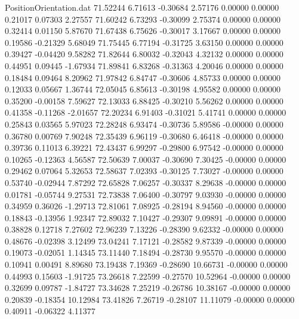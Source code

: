 \begin{filecontents}{PositionOrientation.dat}
  71.52244    6.71613   -0.30684     2.57176    0.00000    0.00000    0.21017    0.07303    2.27557
  71.60242    6.73293   -0.30099     2.75374    0.00000    0.00000    0.32414    0.01150    5.87670
  71.67438    6.75626   -0.30017     3.17667    0.00000    0.00000    0.19586   -0.21329    5.68049
  71.75445    6.77194   -0.31725     3.63150    0.00000    0.00000    0.39427   -0.04420    9.58282
  71.82644    6.80032   -0.32043     4.32132    0.00000    0.00000    0.44951    0.09445   -1.67934
  71.89841    6.83268   -0.31363     4.20046    0.00000    0.00000    0.18484    0.09464    8.20962
  71.97842    6.84747   -0.30606     4.85733    0.00000    0.00000    0.12033    0.05667    1.36744
  72.05045    6.85613   -0.30198     4.95582    0.00000    0.00000    0.35200   -0.00158    7.59627
  72.13033    6.88425   -0.30210     5.56262    0.00000    0.00000    0.41358   -0.11268   -2.01657
  72.20234    6.91403   -0.31021     5.41741    0.00000    0.00000    0.25843    0.03565    5.97023
  72.28248    6.93474   -0.30736     5.89586   -0.00000    0.00000    0.36780    0.00769    7.90248
  72.35439    6.96119   -0.30680     6.46418   -0.00000    0.00000    0.39736    0.11013    6.39221
  72.43437    6.99297   -0.29800     6.97542   -0.00000    0.00000    0.10265   -0.12363    4.56587
  72.50639    7.00037   -0.30690     7.30425   -0.00000    0.00000    0.29462    0.07064    5.32653
  72.58637    7.02393   -0.30125     7.73027   -0.00000    0.00000    0.53740   -0.02944    7.87292
  72.65828    7.06257   -0.30337     8.29638   -0.00000    0.00000    0.01781   -0.05744    9.27531
  72.73838    7.06400   -0.30797     9.03930   -0.00000    0.00000    0.34959    0.36026   -1.29713
  72.81061    7.08925   -0.28194     8.94560   -0.00000    0.00000    0.18843   -0.13956    1.92347
  72.89032    7.10427   -0.29307     9.09891   -0.00000    0.00000    0.38828    0.12718    7.27602
  72.96239    7.13226   -0.28390     9.62332   -0.00000    0.00000    0.48676   -0.02398    3.12499
  73.04241    7.17121   -0.28582     9.87339   -0.00000    0.00000    0.19073   -0.02051    1.14345
  73.11440    7.18494   -0.28730     9.95570   -0.00000    0.00000    0.10941    0.00491    8.89680
  73.19438    7.19369   -0.28690    10.66731   -0.00000    0.00000    0.44993    0.15603   -1.91725
  73.26618    7.22599   -0.27570    10.52964   -0.00000    0.00000    0.32699    0.09787   -1.84727
  73.34628    7.25219   -0.26786    10.38167   -0.00000    0.00000    0.20839   -0.18354   10.12984
  73.41826    7.26719   -0.28107    11.11079   -0.00000    0.00000    0.40911   -0.06322    4.11377

\end{filecontents}
